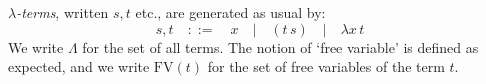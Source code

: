 \documentclass[10pt,a4paper]{amsart}
\theoremstyle{plain}
\newtheorem{theorem}[theorem]{Theorem}
\theoremstyle{definition}
\newtheorem{remark}[remark]{Remark}
\newcommand{\anupam}[1]{\todo[color=green]{A: #1}}
\renewcommand{\todo}[1]{}
\renewcommand{\anupam}[1]{}
\theoremstyle{plain}
\theoremstyle{definition} %
\newcommand{\FV}{\mathrm{FV}}
\newcommand{\fv}[1]{\FV(#1)}
\newcommand{\var}{\mathrm{var}}
\newcommand{\closure}[1]{\langle #1 \rangle}
\newcommand{\LJ}{\mathsf{LJ}}
\newcommand{\muLJ}{\mu\LJ}
\newcommand{\muLJneg}{\muLJ^-}
\newcommand{\circular}{\mathsf C}
\newcommand{\cmuLJ}{\circular\muLJ}
\newcommand{\cmuLJneg}{\cmuLJ^-}
\newcommand{\rewrite}{\rightsquigarrow}
\newcommand{\reductionnorec}{\mathrm{r}'}
\newcommand{\reducesnoreceta}{\rewrite_{\reductionnorec}^\eta} %
\begin{document}


\anupam{I commented a remark below that seems completely out of place.}








\emph{$\lambda$-terms}, written $s,t$ etc., are generated as usual by:
\[
s,t \quad ::= \quad 
x \quad | \quad (t\, s) \quad | \quad \lambda x \,  t 
\]
We write $\Lambda$ for the set of all terms.
The notion of `free variable' is defined as expected, and we write $\fv t $ for the set of free variables of the term $t$.






\newcommand{\doublepair}[2]{\langle \! \langle {#1}, {#2}\rangle \! \rangle}
\newcommand{\doubleproj}[2]{\pi_{#1}\,  {#2}}
\newcommand{\godel}[1]{\lceil {#1} \rceil}
\end{document}
